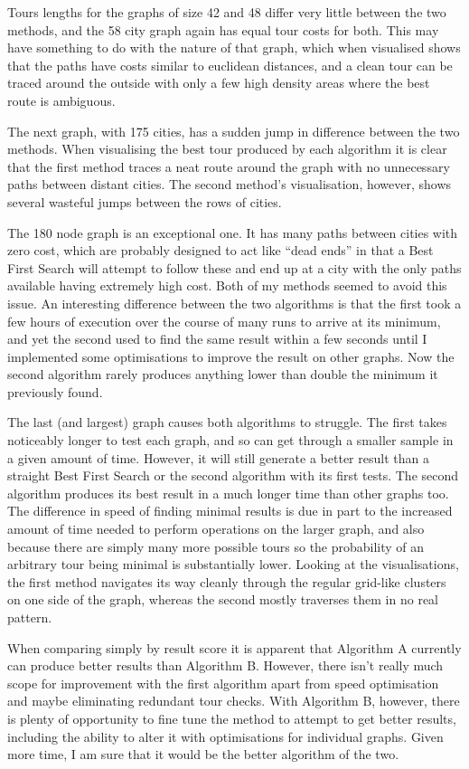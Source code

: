 \documentclass[a4paper,11pt]{article}
\begin{document}
Tours lengths for the graphs of size 42 and 48 differ very little between
the two methods, and the 58 city graph again has equal tour costs for both.
This may have something to do with the nature of that graph, which when
visualised shows that the paths have costs similar to euclidean distances, and
a clean tour can be traced around the outside with only a few high density
areas where the best route is ambiguous.

The next graph, with 175 cities, has a sudden jump in difference between the
two methods. When visualising the best tour produced by each algorithm it is
clear that the first method traces a neat route around the graph with no
unnecessary paths between distant cities. The second method's visualisation,
however, shows several wasteful jumps between the rows of cities.

The 180 node graph is an exceptional one. It has many paths between cities with
zero cost, which are probably designed to act like ``dead ends'' in that a
Best First Search will attempt to follow these and end up at a city with the
only paths available having extremely high cost. Both of my methods seemed to
avoid this issue. An interesting difference between the two algorithms
is that the first took a few hours of execution over the course of many runs to 
arrive at its minimum, and yet the second used to find the same result within a
few seconds until I implemented some optimisations to improve the result on
other graphs. Now the second algorithm rarely produces anything lower than
double the minimum it previously found.

The last (and largest) graph causes both algorithms to struggle. The first
takes noticeably longer to test each graph, and so can get through a smaller
sample in a given amount of time. However, it will still generate a better
result than a straight Best First Search or the second algorithm with its first
tests. The second algorithm produces its best result in a much longer time than
other graphs too. The difference in speed of finding minimal results is due in
part to the increased amount of time needed to perform operations on the larger
graph, and also because there are simply many more possible tours so the
probability of an arbitrary tour being minimal is substantially lower. Looking
at the visualisations, the first method navigates its way cleanly through the
regular grid-like clusters on one side of the graph, whereas the second mostly
traverses them in no real pattern.

When comparing simply by result score it is apparent that Algorithm A currently
can produce better results than Algorithm B. However, there isn't really much
scope for improvement with the first algorithm apart from speed optimisation
and maybe eliminating redundant tour checks. With Algorithm B, however, there
is plenty of opportunity to fine tune the method to attempt to get better
results, including the ability to alter it with optimisations for individual
graphs. Given more time, I am sure that it would be the better algorithm of the
two.
\end{document}
